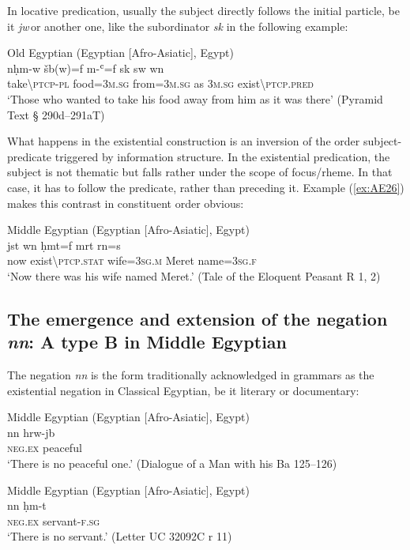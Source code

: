 \documentclass[output=paper]{langsci/langscibook}
\newcommand{\ꜥ}{ʿ}
\newcommand{\ꜣ}{\kern-.25pt\texttt{ꜣ}\kern-.6pt}
\begin{document}
In locative predication, usually the subject directly follows the initial particle, be it \textit{jw} or another one, like the subordinator \textit{sk} in the following example:  

\ea Old Egyptian (Egyptian [Afro-Asiatic], Egypt) \label{ex:AE25}\\
    \gll nḥm-w šb(w)=f m-{\ꜥ}=f sk sw wn\\
    take\textbackslash\textsc{ptcp-pl} food=\textsc{3m.sg} from=\textsc{3m.sg} as \textsc{3m.sg} exist\textbackslash\textsc{ptcp.pred}\\ 
    \glt ‘Those who wanted to take his food away from him as it was there’ (Pyramid Text § 290d–291aT) 
\z 
 
What happens in the existential construction is an inversion of the order subject-predicate triggered by information structure. In the existential predication, the subject is not thematic but falls rather under the scope of focus/rheme. In that case, it has to follow the predicate, rather than preceding it. Example (\ref{ex:AE26}) makes this contrast in constituent order obvious:  
 
\ea Middle Egyptian (Egyptian [Afro-Asiatic], Egypt) \label{ex:AE26}\\
    \gll jst wn ḥmt=f mrt rn=s\\
    now exist\textbackslash\textsc{ptcp.stat} wife=\textsc{3sg.m} Meret name=\textsc{3sg.f}\\  
    \glt ‘Now there was his wife named Meret.’ (Tale of the Eloquent Peasant R 1, 2) 
\z 


\subsection{The emergence and extension of the negation \textit{nn}: A type B in Middle Egyptian}\label{s:AE2-3}

The negation \textit{nn} is the form traditionally acknowledged in grammars as the existential negation in Classical Egyptian, be it literary or documentary: 
 
\ea Middle Egyptian (Egyptian [Afro-Asiatic], Egypt) \label{ex:AE27}\\
    \gll nn hrw-jb\\  
    \textsc{neg.ex} peaceful\\ 
    \glt ‘There is no peaceful one.’ (Dialogue of a Man with his Ba 125–126)
\z 
 
\ea Middle Egyptian (Egyptian [Afro-Asiatic], Egypt) \label{ex:AE28}\\
    \gll nn ḥm-t \\
    \textsc{neg.ex} servant-\textsc{f.sg}\\ 
    \glt ‘There is no servant.’ (Letter UC 32092C r 11)
\z 
\end{document}
